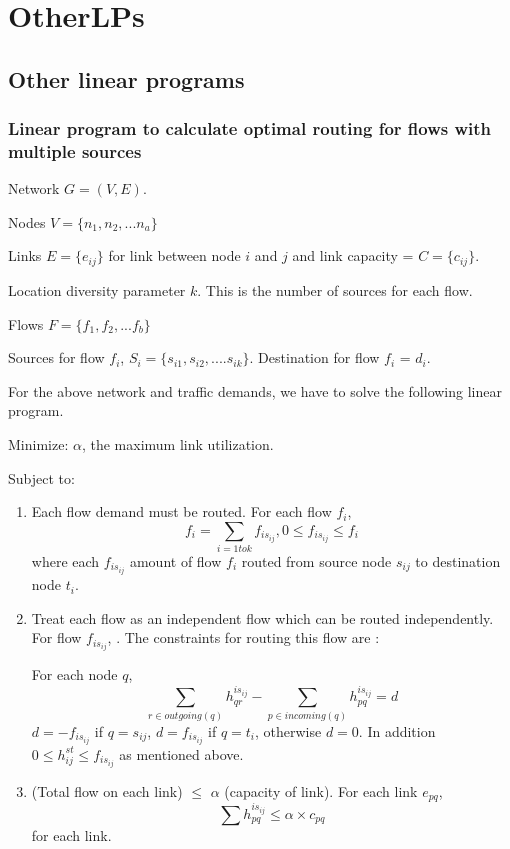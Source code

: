 \section{OtherLPs}

\subsection{Other linear programs}

\subsubsection{Linear program to calculate optimal routing for flows with multiple sources}

\label{sec:lpminmlu}

Network  $G = (V,E)$.

Nodes $V = \{ n_1, n_2, ... n_a  \}$

Links $ E = \{ e_{ij}\}$ for link between node $i$ and  $j$ and link capacity = $ C = \{ c_{ij}\}$.

Location diversity parameter $k$. This is the number of sources for each flow.

Flows $F = \{f_1, f_2, ... f_b\}$ 

Sources for flow $f_i$, $S_i = \{ s_{i1},s_{i2},....s_{ik} \}$. Destination for flow $f_i$ = $d_i$.


For the above network and traffic demands, we have to solve the following linear program.

Minimize:  $\alpha$, the maximum link utilization.

Subject to:
\begin{enumerate}
\item 
Each flow demand must be routed. For each flow $f_i$,
\[ f_i = \sum_{i = 1 to k }  f_{is_{ij}}, 0 \leq  f_{is_{ij}} \leq f_i \]
where each $f_{is_{ij}}$ amount of flow $f_i$ routed from source node $s_{ij}$ to destination node $t_i$. 

\item 
Treat each flow as an independent flow which can be routed independently. For flow $f_{is_{ij}}$, . The constraints for routing this flow are :

For each node $q$,
\[ \sum_{r \in outgoing(q)} h_{qr}^{is_{ij}} - \sum_{p \in incoming(q)} h_{pq}^{is_{ij}} = d\]
$d = -f_{is_{ij}}$ if $q = s_{ij}$, $d = f_{is_{ij}}$ if $q = t_i$, otherwise $d = 0$. In addition $0 \leq h_{ij}^{st} \leq f_{is_{ij}}$ as mentioned above.

\item
(Total flow on each link) $\leq $ $\alpha $ (capacity of link). For each link $e_{pq}$, 
\[ \sum h_{pq}^{is_{ij}} \leq \alpha \times c_{pq} \]
for each link.

\end{enumerate}

